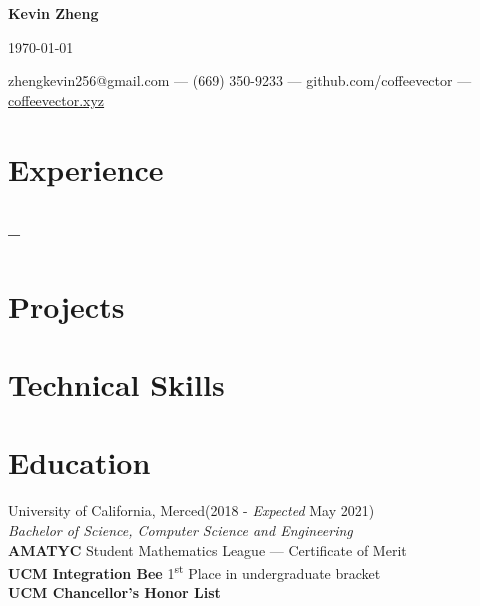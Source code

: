 \documentclass[letterpaper,12pt]{article}
\makeatletter
\newcommand\textbox[1]{%
    \parbox{.333\textwidth}{#1}%
}
\renewcommand{\maketitle}{
    \begin{center}
        \noindent\textbox{\hfill}\textbox{\hfil\bfseries\huge Kevin Zheng\hfil}\textbox{\hfill \today}
        {\faEnvelope \enskip zhengkevin256@gmail.com --- \faPhone \enskip (669) 350-9233 --- \faGithub \enskip github.com/coffeevector --- \faChain \enskip \underline{\color{blue}coffeevector.xyz}}
    \end{center} }
\makeatother
\begin{document}
\maketitle
\section{Experience}
    \subsection{ -- \null\hfill {}}
    \vspace*{-2mm}
\section{Projects}
    \subsection{\null\hfill {}}
    \vspace*{-2mm}
\section{Technical Skills}
    \subsection{}
    \vspace*{-4mm}
\section{Education}
University of California, Merced\null\hfill(2018 - \emph{Expected} May 2021)\\
           \emph{Bachelor of Science, Computer Science and Engineering}
    \\\textbf{AMATYC} Student Mathematics League --- Certificate of Merit\\
    \textbf{UCM Integration Bee} 1\textsuperscript{st} Place in undergraduate bracket\\
    \textbf{UCM Chancellor's Honor List}
    \vspace*{-2mm}
%
\end{document}
